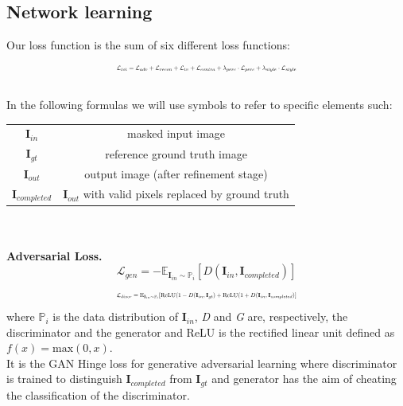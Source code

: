 \documentclass[10pt,twocolumn,letterpaper]{article}
\begin{document}
\subsection{Network learning}
Our loss function is the sum of six different loss functions:
\begin{equation}
    \resizebox{.47 \textwidth}{!}{%
    $\mathcal{L}_{tot} = \mathcal{L}_{adv} + \mathcal{L}_{recon} + \mathcal{L}_{tv} + \mathcal{L}_{contra} + \lambda_{perc} \cdot \mathcal{L}_{perc} + \lambda_{style} \cdot \mathcal{L}_{style}$%
    }
\end{equation}
\\
In the following formulas we will use symbols to refer to specific elements such:
\\
\begin{tabular}{ c c }
    \(\mathbf{I}_{in}\)        & masked input image\\
    \(\mathbf{I}_{gt}\)        & reference ground truth image \\
    \(\mathbf{I}_{out}\)       & output image (after refinement stage) \\
    \(\mathbf{I}_{completed}\) & \(\mathbf{I}_{out}\) with valid pixels replaced by ground truth \\
\end{tabular}
\\
\\
\textbf{Adversarial Loss.} 
\begin{equation}
    \mathcal{L}_{gen} = -\mathbb{E}_{\mathbf{I}_{in} \sim \mathbb{P}_i} [D(\mathbf{I}_{in},\mathbf{I}_{completed})]
\end{equation}
\begin{equation}
    \resizebox{.47 \textwidth}{!}{%
    $\mathcal{L}_{discr} = \mathbb{E}_{\mathbf{I}_{in} \sim \mathbb{P}_i} [\mathrm{ReLU}(1-D(\mathbf{I}_{in},\mathbf{I}_{gt}) + \mathrm{ReLU}(1+D(\mathbf{I}_{in},\mathbf{I}_{completed})]$%
    }
\end{equation}
where \(\mathbb{P}_i\) is the data distribution of \(\mathbf{I}_{in}\), \textit{D} and \textit{G} are, respectively, the discriminator and the generator and ReLU is the rectified linear unit defined as \(f(x) = \mathrm{max}(0,x)\).\\
It is the GAN Hinge loss for generative adversarial learning where discriminator is trained to distinguish \(\mathbf{I}_{completed}\) from \(\mathbf{I}_{gt}\) and generator has the aim of cheating the classification of the discriminator.
\\
\\
\end{document}
